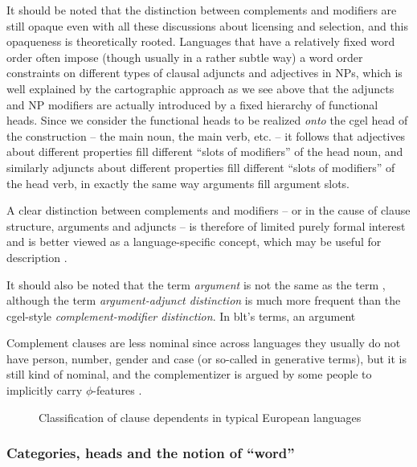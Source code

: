 \documentclass[../main.tex]{subfiles}
\begin{document}
It should be noted that the distinction between complements and modifiers are still opaque even with 
all these discussions about licensing and selection, and this opaqueness is theoretically rooted. 
Languages that have a relatively fixed word order often impose (though usually in a rather subtle way) 
a word order constraints on different types of clausal adjuncts and adjectives in NPs, 
which is well explained by the cartographic approach as we see above that the adjuncts and NP modifiers 
are actually introduced by a fixed hierarchy of functional heads. Since we consider the functional heads 
to be realized \emph{onto} the \ac{cgel} head of the construction -- the main noun, the main verb, etc. -- 
it follows that adjectives about different properties fill different ``slots of modifiers'' of the head noun, 
and similarly adjuncts about different properties fill different ``slots of modifiers'' of the head verb, 
in exactly the same way arguments fill argument slots. 

A clear distinction between complements and modifiers -- or in the cause of clause structure, arguments and
adjuncts -- is therefore of limited purely formal interest and is better viewed as a language-specific concept, 
which may be useful for description \citep{haspelmath2014arguments}. 

It should also be noted that the term \emph{argument} is not the same as the term , 
although the term \emph{argument-adjunct distinction} is much more frequent than the \ac{cgel}-style 
\emph{complement-modifier distinction}.
In \ac{blt}'s terms, an argument %

Complement clauses are less nominal since across languages they usually do not have person, number, gender and 
case (or so-called  in generative terms), but it is still kind of nominal, 
and the complementizer is argued by some people to implicitly carry $\phi$-features \citep{complement-clause}.

\begin{figure}
    \centering
    
    \caption{Classification of clause dependents in typical European languages}
\end{figure}

\subsubsection{Categories, heads and the notion of ``word''}
\end{document}
